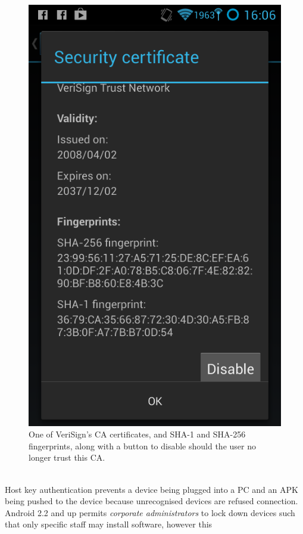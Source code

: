\documentclass[a4paper]{article}
\begin{document}
\begin{figure}[htb]
\centering
\includegraphics[scale=0.4, bb=0 0 480
800]{img/verisign.png}
\caption{One of VeriSign's CA certificates, and SHA-1 and SHA-256 fingerprints,
along with a button to disable should the user no longer trust this CA.}
\label{fig:verisign}
\end{figure}
\\
\noindent Host key authentication prevents a device being plugged into a PC and
an APK being pushed to the device because unrecognised devices are refused
connection.
\\
\noindent Android 2.2 and up permits \emph{corporate administrators} to lock
down devices such that only specific staff may install software, however this
\end{document}

